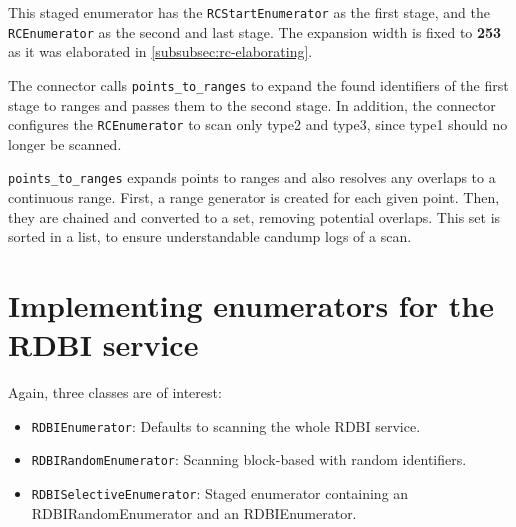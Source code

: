 This staged enumerator has the \texttt{RCStartEnumerator} as the first stage, and the \texttt{RCEnumerator} as the second and last stage.
The expansion width is fixed to \textbf{253} as it was elaborated in \autoref{subsubsec:rc-elaborating}.

The connector calls \texttt{points_to_ranges} to expand the found identifiers of the first stage to ranges and passes them to the second stage. In addition, the connector configures the \texttt{RCEnumerator} to scan only type2 and type3, since type1 should no longer be scanned.


\texttt{points_to_ranges} expands points to ranges and also resolves any overlaps to a continuous range.
First, a range generator is created for each given point. Then, they are chained and converted to a set, removing potential overlaps. This set is sorted in a list, to ensure understandable candump logs of a scan.

\section{Implementing enumerators for the RDBI service}

Again, three classes are of interest:

\begin{itemize}
    \item \texttt{RDBIEnumerator}: Defaults to scanning the whole RDBI service.
    \item \texttt{RDBIRandomEnumerator}: Scanning block-based with random identifiers.
    \item \texttt{RDBISelectiveEnumerator}: Staged enumerator containing an RDBIRandomEnumerator and an RDBIEnumerator.
\end{itemize}


